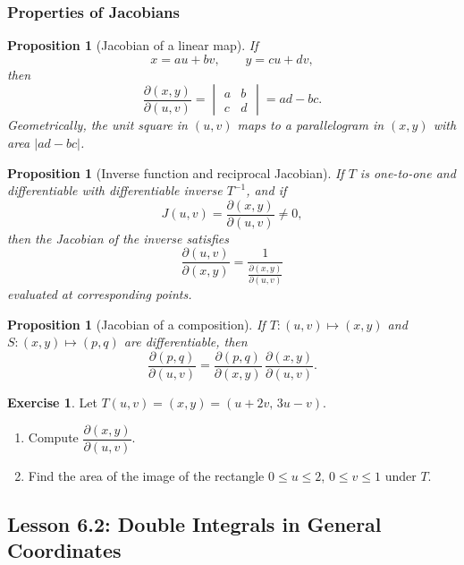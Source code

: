 \documentclass[12pt]{article}
\numberwithin{equation}{section}
\theoremstyle{plain}
\newtheorem{proposition}[theorem]{Proposition}
\theoremstyle{definition}
\newtheorem{exercise}[theorem]{Exercise}
\theoremstyle{remark}
\begin{document}
\subsubsection{Properties of Jacobians}

\begin{proposition}[Jacobian of a linear map]\label{prop:linear-jac}
If
\[
x=au+bv,\qquad y=cu+dv,
\]
then
\[
\frac{\partial(x,y)}{\partial(u,v)}=
\begin{vmatrix}
a & b\\
c & d
\end{vmatrix}
=ad-bc.
\]
Geometrically, the unit square in $(u,v)$ maps to a parallelogram in $(x,y)$ with area $|ad-bc|$.
\end{proposition}

\begin{proposition}[Inverse function and reciprocal Jacobian]\label{prop:inverse-jac}
If $T$ is one-to-one and differentiable with differentiable inverse $T^{-1}$, and if
\[
J(u,v)=\frac{\partial(x,y)}{\partial(u,v)}\neq 0,
\]
then the Jacobian of the inverse satisfies
\begin{equation}\label{eq:inverse-jac}
\frac{\partial(u,v)}{\partial(x,y)}=\frac{1}{\frac{\partial(x,y)}{\partial(u,v)}}
\end{equation}
evaluated at corresponding points.
\end{proposition}

\begin{proposition}[Jacobian of a composition]\label{prop:comp-jac}
If $T:(u,v)\mapsto (x,y)$ and $S:(x,y)\mapsto (p,q)$ are differentiable, then
\[
\frac{\partial(p,q)}{\partial(u,v)}
=
\frac{\partial(p,q)}{\partial(x,y)}\,
\frac{\partial(x,y)}{\partial(u,v)}.
\]
\end{proposition}

\begin{exercise}
Let $T(u,v)=(x,y)=(u+2v,\,3u-v)$.
\begin{enumerate}[label=(\alph*)]
\item Compute $\dfrac{\partial(x,y)}{\partial(u,v)}$.
\item Find the area of the image of the rectangle $0\le u\le 2$, $0\le v\le 1$ under $T$.
\end{enumerate}
\end{exercise}

\subsection{Lesson 6.2: Double Integrals in General Coordinates}
\end{document}
